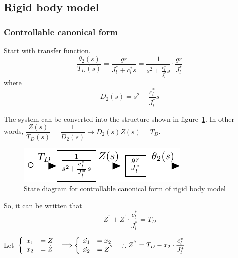 \documentclass[a4paper, 12pt]{article}
\begin{document}
\subsection{Rigid body model}
\subsubsection{Controllable canonical form}
\hspace{2.5ex}
Start with transfer function. 
\begin{equation}\label{rigidControllable}
\dfrac{\theta_2(s)}{T_D(s)} = \dfrac{gr}{J_l^*+ c_l^* s} = \dfrac{1}{s^2 + \frac{c_l^*}{J_l^*} s} \cdot \dfrac{gr}{J_l^*}
\end{equation}
where 
\begin{equation}
D_2(s) = s^2 + \frac{c_l^*}{J_l^*} s
\end{equation}

The system can be converted into the structure shown in figure~\ref{rigidControllableChart}. In other words, $\dfrac{Z(s)}{T_D(s)} = \dfrac{1}{D_2(s)} \longrightarrow D_2(s) Z(s) = T_D$. 


\begin{figure}[!htbp]
\centering
\includegraphics[scale = 1.5]{Controllable4RigidBody}
\caption{State diagram for controllable canonical form of rigid body model}
\label{rigidControllableChart}
\end{figure}
 
So, it can be written that
\begin{equation}\label{RigidControllableZ}
Z^{''} + Z^{'}\cdot \dfrac{c_l^*}{J_l^*} = T_D
\end{equation}

Let $\left\{ \begin{array}{l l}
x_1 &= Z	\\
x_2 &= \dot{Z}	\\
\end{array}\right.\ 
\Longrightarrow
\left\{ \begin{array}{l l}
\dot{x_1} &= x_2	\\
\dot{x_2} &= Z^{''}	\\
\end{array}\right.\ 
 \therefore Z^{''} = T_D - x_2\cdot \dfrac{c_l^*}{J_l^*}$
\end{document}
